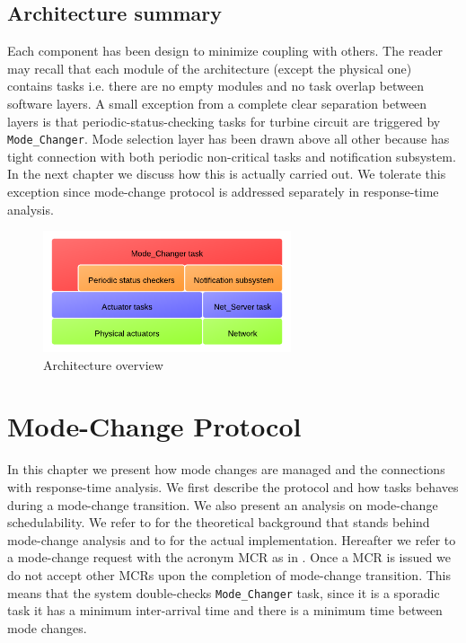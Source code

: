\documentclass[10pt,a4paper]{report}
\begin{document}
\section{Architecture summary}
Each component has been design to minimize coupling with others. The reader may
recall that each module of the architecture (except the physical one) 
contains tasks i.e. there are no empty modules and no task overlap between 
software layers. A small exception from a complete clear separation between 
layers is that periodic-status-checking tasks for turbine circuit are triggered 
by \texttt{Mode\_Changer}. Mode selection layer has been drawn above all other 
because has tight connection with both periodic non-critical tasks and 
notification subsystem. In the next chapter we discuss how this is actually 
carried out. We tolerate this exception since mode-change protocol is addressed 
separately in response-time analysis.
\begin{figure}[h!tb]
\centering
\includegraphics[width=0.65\textwidth]{images/ArchitectureOverview}
\caption{Architecture overview}
\label{fig:archover}
\end{figure}

\chapter{Mode-Change Protocol}
In this chapter we present how mode changes are managed and the connections with 
response-time analysis. We first describe the protocol and how tasks behaves
during a mode-change transition. We also present an analysis on mode-change 
schedulability. We refer to \cite{real04} for the theoretical background that 
stands behind mode-change analysis and to \cite{real99} for the actual 
implementation. Hereafter we refer to a mode-change request with the acronym 
MCR as in \cite{real04}. Once a MCR is issued we do not accept other MCRs upon
the completion of mode-change transition. This means that the system double-checks
\texttt{Mode\_Changer} task, since it is a sporadic task it has a minimum
inter-arrival time and there is a minimum time between mode changes. 
\end{document}

